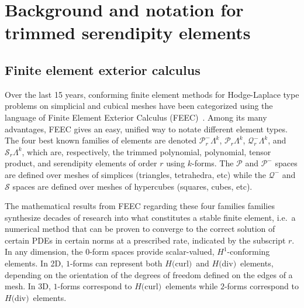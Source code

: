 \documentclass[manuscript,screen]{acmart}
\newcommand{\calP}{\mathcal{P}}
\newcommand{\calQ}{\mathcal{Q}}
\newcommand{\calS}{\mathcal{S}}
\newcommand{\hcurl}{$H($curl$)$}
\newcommand{\hdiv}{$H($div$)$}
\begin{document}
  \section{Background and notation for trimmed serendipity elements}
  
  \subsection{Finite element exterior calculus}
    Over the last 15 years, conforming finite element methods for Hodge-Laplace type problems on simplicial and cubical meshes have been categorized using the language of Finite Element Exterior Calculus (FEEC)~\cite{AFW2006,AFW2010,ABB2012}.  Among its many advantages, FEEC gives an easy, unified way to notate different element types.  The four best known families of elements are denoted $\calP^-_r \Lambda^k$, $\calP_r \Lambda^k$, $\calQ^-_r \Lambda^k$, and $\calS_r \Lambda^k$, which are, respectively, the trimmed polynomial, polynomial, tensor product, and serendipity elements of order $r$ using $k$-forms.  The $\calP$ and $\calP^-$ spaces are defined over meshes of simplices (triangles, tetrahedra, etc) while the $\calQ^-$ and $\calS$ spaces are defined over meshes of hypercubes (squares, cubes, etc).  
    
    The mathematical results from FEEC regarding these four families families synthesize decades of research into what constitutes a stable finite element, i.e.\ a numerical method that can be proven to converge to the correct solution of certain PDEs in certain norms at a prescribed rate, indicated by the subscript $r$.  In any dimension, the $0$-form spaces provide scalar-valued, $H^1$-conforming elements.  In 2D, $1$-forms can represent both \hcurl~and \hdiv~elements, depending on the orientation of the degrees of freedom defined on the edges of a mesh.  In 3D, $1$-forms correspond to \hcurl~elements while $2$-forms correspond to \hdiv~elements.  
        
    
\end{document}

